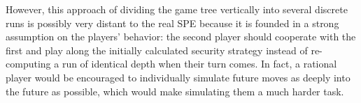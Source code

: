 \documentclass[conference]{IEEEtran}
\begin{document}
However, this approach of dividing the game tree vertically into several discrete runs is possibly very distant to the real SPE because it is founded in a strong assumption on the players' behavior: the second player should cooperate with the first and play along the initially calculated security strategy instead of re-computing a run of identical
depth when their turn comes. In fact, a rational player would be encouraged to individually simulate future moves as deeply into the future as possible, which would make simulating them a much harder task.

\begin{table}[h]
    \centering
{\ttfamily %
}
\end{table}
\end{document}
